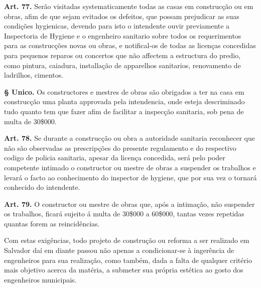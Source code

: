 \begin{citacao}
\textbf{Art. 77.} Serão visitadas systematicamente todas as casas em construcção ou em obras, afim de que sejam evitados os defeitos, que possam prejudicar as suas condições hygienicas, devendo para isto o intendente ouvir previamente a Inspectoria de Hygiene e o engenheiro sanitario sobre todos os requerimentos para as construcções novas ou obras, e notifical-os de todas as licenças concedidas para pequenos reparos ou concertos que não affectem a estructura do predio, como pintura, caiadura, installação de apparelhos sanitarios, renovamento de ladrilhos, cimentos.

\textbf{§ Unico.} Os constructores e mestres de obras são obrigados a ter na casa em construcção uma planta approvada pela intendencia, onde esteja descriminado tudo quanto tem que fazer afim de facilitar a inspecção sanitaria, sob pena de multa de 30\$000.

\textbf{Art. 78.} Se durante a construcção ou obra a autoridade sanitaria reconhecer que não são observadas as prescripções do presente regulamento e do respectivo codigo de policia sanitaria, apesar da licença concedida, será pelo poder competente intimado o constructor ou mestre de obras a suspender os trabalhos e levará o facto ao conhecimento do inspector de hygiene, que por sua vez o tornará conhecido do intendente.

\textbf{Art. 79.} O constructor ou mestre de obras que, após a intimação, não suspender os trabalhos, ficará sujeito á multa de 30\$000 a 60\$000, tantas vezes repetidas quantas forem as reincidências.
\end{citacao}

Com estas exigências, todo projeto de construção ou reforma a ser realizado em Salvador daí em diante passou não apenas a condicionar-se à ingerência de engenheiros para sua realização, como também, dada a falta de qualquer critério mais objetivo acerca da matéria, a submeter sua própria estética ao gosto dos engenheiros municipais.

